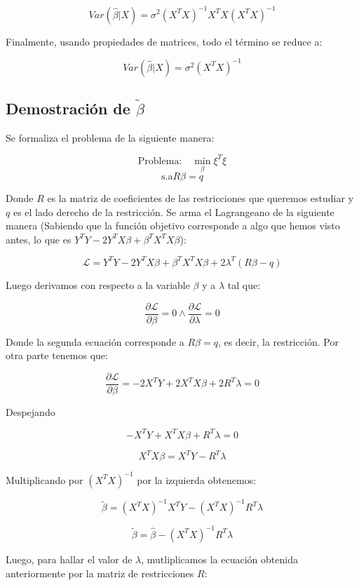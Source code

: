 \documentclass[
]{book}
\begin{document}
\[
Var(\hat{\beta}|X) = \sigma^2(X^TX)^{-1}X^TX(X^TX)^{-1}
\]

Finalmente, usando propiedades de matrices, todo el término se reduce a:

\[
Var(\hat{\beta}|X) = \sigma^2(X^TX)^{-1}
\]

\subsection{\texorpdfstring{Demostración de \(\tilde{\beta}\)}{Demostración de \textbackslash tilde\{\textbackslash beta\}}}\label{demostraciuxf3n-de-tildebeta}

Se formaliza el problema de la siguiente manera:

\[
\text{Problema:} \quad \min_{\beta} \xi^T\xi
\]
\[
\text{s.a} R\beta = q
\]

Donde \(R\) es la matriz de coeficientes de las restricciones que queremos estudiar y \(q\) es el lado derecho de la restricción.
Se arma el Lagrangeano de la siguiente manera (Sabiendo que la función objetivo corresponde a algo que hemos visto antes, lo que es \(Y^TY - 2 Y^TX\beta + \beta^T X^T X \beta\)):

\[
\mathcal{L} =  Y^TY - 2 Y^TX\beta + \beta^T X^T X \beta + 2\lambda^T(R\beta - q)
\]

Luego derivamos con respecto a la variable \(\beta\) y a \(\lambda\) tal que:

\[
\frac{\partial \mathcal{L}}{\partial \beta} = 0 \land \frac{\partial \mathcal{L}}{\partial \lambda} = 0
\]

Donde la segunda ecuación corresponde a \(R\beta = q\), es decir, la restricción. Por otra parte tenemos que:

\[
\frac{\partial \mathcal{L}}{\partial \beta} = -2X^TY + 2X^TX\beta + 2R^T\lambda = 0
\]

Despejando

\[
-X^TY + X^TX\beta + R^T\lambda = 0
\]

\[
X^TX\beta = X^TY -R^T\lambda
\]

Multiplicando por \((X^TX)^{-1}\) por la izquierda obtenemos:

\[
\widetilde{\beta} = (X^TX)^{-1}X^TY - (X^TX)^{-1}R^T\lambda
\]

\[
\widetilde{\beta} = \hat{\beta} - (X^TX)^{-1}R^T\lambda
\]

Luego, para hallar el valor de \(\lambda\), mutliplicamos la ecuación obtenida anteriormente por la matriz de restricciones \(R\):
\end{document}
